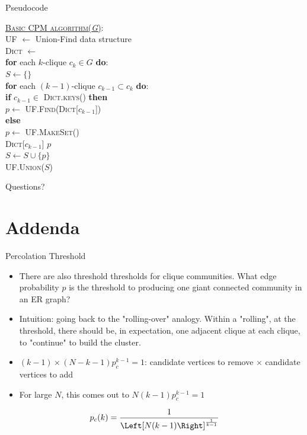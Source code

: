 \documentclass[aspectratio=169, handout]{beamer}
\begin{document}
\begin{frame}{Pseudocode}
\begin{nalgo}
    \underline{\textsc{Basic CPM algorithm}(\emph{G})}:
    \\\label{}  \textsc{UF} $\gets$ Union-Find data structure
    \\\label{}  \textsc{Dict} $\gets$ \Left[\Right]
    \\\label{}  \textbf{for} each $k$-clique $c_k \in  G$ \textbf{do}:\+
    \\\label{communities of $c_k$ to merge}    $S \gets \{\}$
    \\\label{}    \textbf{for} each $(k-1)$-clique $c_{k-1} \subset c_k$ \textbf{do}:\+
    \\\label{}      \textbf{if} $c_{k-1} \in$ \textsc{Dict.keys()} \textbf{then}\+
    \\\label{}        $p \gets$ \textsc{UF.Find(Dict[$c_{k-1}$])}\-
    \\\label{}      \textbf{else}\+
    \\\label{}        $p \gets$ \textsc{UF.MakeSet()}
    \\\label{}        \textsc{Dict[$c_{k-1}$]} \gets $p$\-
    \\\label{}        $S \gets S \cup \{p\}$\-
    \\\label{}        \textsc{UF.Union($S$)}
    \end{nalgo}
\end{frame}

\begin{frame}{}
      \begin{center}
    {\color{sigma@mainblue} \LARGE Questions?}
  \end{center}
\end{frame}

\section{Addenda}
\frame{\sectionpage}

\begin{frame}{Percolation Threshold}
\begin{itemize}
\item There are also threshold thresholds for clique communities. What edge probability $p$ is the threshold to producing one giant connected community in an ER graph?
\pause
\item Intuition: going back to the "rolling-over" analogy. Within a "rolling", at the threshold, there should be, in expectation, one adjacent clique at each clique, to "continue" to build the cluster.
\pause
\item $(k-1) \times (N - k - 1) p_c^{k-1} = 1$: candidate vertices to remove $\times$ candidate vertices to add
\item For large $N$, this comes out to $N(k-1) p_c^{k-1} = 1$ \cite{CPM05}
\pause
\end{itemize}
\begin{align}
p_c(k) = \frac{1}{\Left[ N(k-1) \Right]^{\frac{1}{k-1}}}
\end{align}
\end{frame}
\end{document}
